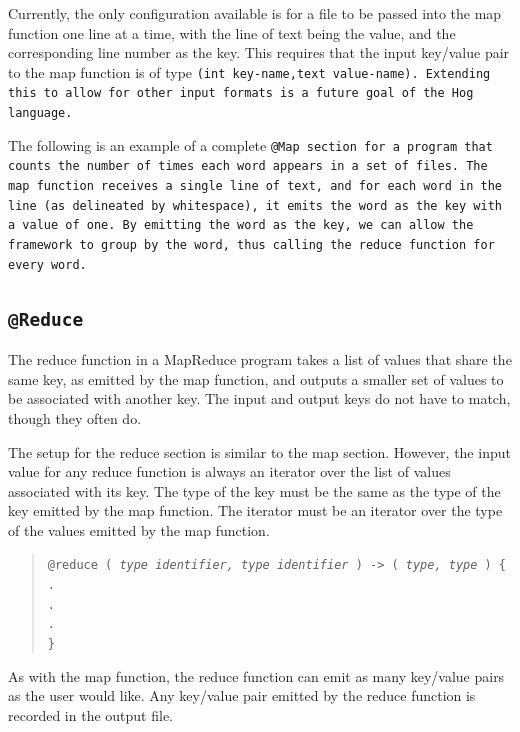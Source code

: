 \documentclass{article}
\begin{document}
Currently, the only configuration available is for a file to be passed into the map
function one line at a time, with the line of text being the value, and the
corresponding line number as the key. This requires that the input key/value pair
to the map function is of type \tt (int key‐name,text value‐name)\rm. Extending
this to allow for other input formats is a future goal of the Hog language.

The following is an example of a complete \tt @Map \rm section for a program that
counts the number of times each word appears in a set of files. The map function
receives a single line of text, and for each word in the line (as delineated by
whitespace), it emits the word as the key with a value of one. By emitting the word
as the key, we can allow the framework to group by the word, thus calling the
reduce function for every word.


\subsection{\tt @Reduce \rm} %
\label{sub:tt_reduce_rm}

The reduce function in a MapReduce program takes a list of values that share the
same key, as emitted by the map function, and outputs a smaller set of values to be
associated with another key. The input and output keys do not have to match, though
they often do.

The setup for the reduce section is similar to the map section. However, the input
value for any reduce function is always an iterator over the list of values
associated with its key. The type of the key must be the same as the type of the
key emitted by the map function. The iterator must be an iterator over the type of
the values emitted by the map function.

\begin{quotation}
  \tt @reduce ( \rm \emph{type identifier, type identifier} \tt ) -> ( \rm \emph{type, type} \tt ) \{ \\
  \indent \indent . \\
  \indent \indent . \\
  \indent \indent . \\
  \indent \tt \} \rm
\end{quotation}

As with the map function, the reduce function can emit as many key/value pairs as
the user would like. Any key/value pair emitted by the reduce function is recorded
in the output file.
\end{document}
